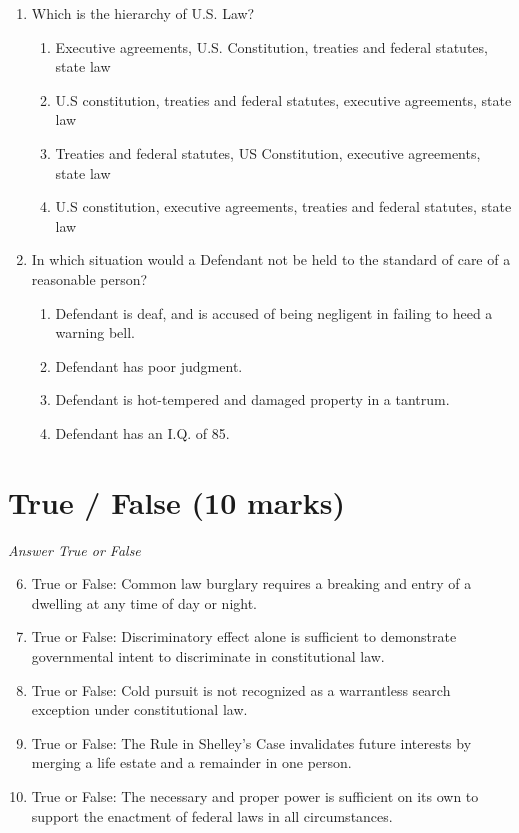 \documentclass[12pt]{article}
\begin{document}
\begin{enumerate}[label=\arabic*.]
\item Which is the hierarchy of U.S. Law?
\begin{enumerate}[label=(\alph*)]
    \item Executive agreements, U.S. Constitution, treaties and federal statutes, state law
    \item U.S constitution, treaties and federal statutes, executive agreements, state law
    \item Treaties and federal statutes, US Constitution, executive agreements, state law
    \item U.S constitution, executive agreements, treaties and federal statutes, state law
\end{enumerate}
\item In which situation would a Defendant not be held to the standard of care of a reasonable person?
\begin{enumerate}[label=(\alph*)]
    \item Defendant is deaf, and is accused of being negligent in failing to heed a warning bell.
    \item Defendant has poor judgment.
    \item Defendant is hot-tempered and damaged property in a tantrum.
    \item Defendant has an I.Q. of 85.
\end{enumerate}
\end{enumerate}

\section*{True / False (10 marks)}
\textit{Answer True or False}
\begin{enumerate}[label=\arabic*.]
\setcounter{enumi}{5}
\item True or False: Common law burglary requires a breaking and entry of a dwelling at any time of day or night.
\item True or False: Discriminatory effect alone is sufficient to demonstrate governmental intent to discriminate in constitutional law.
\item True or False: Cold pursuit is not recognized as a warrantless search exception under constitutional law.
\item True or False: The Rule in Shelley's Case invalidates future interests by merging a life estate and a remainder in one person.
\item True or False: The necessary and proper power is sufficient on its own to support the enactment of federal laws in all circumstances.
\end{enumerate}
\end{document}
